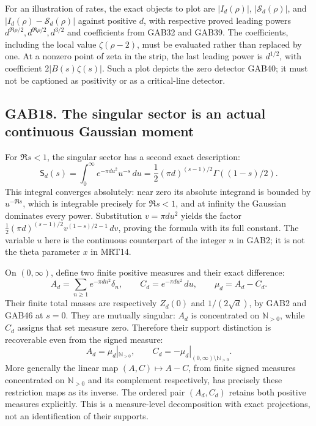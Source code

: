 \documentclass[
  10pt,
  a4paper,
]{article}
\begin{document}
For an illustration of rates, the exact objects to plot are
\(|I_d(\rho)|\), \(|\mathcal S_d(\rho)|\), and
\(|I_d(\rho)-\mathcal S_d(\rho)|\) against positive \(d\), with
respective proved leading powers \(d^{\Re\rho/2},d^{\Re\rho/2},d^{3/2}\)
and coefficients from GAB32 and GAB39. The coefficients, including the
local value \(\zeta(\rho-2)\), must be evaluated rather than replaced by
one. At a nonzero point of zeta in the strip, the last leading power is
\(d^{1/2}\), with coefficient \(2|B(s)\zeta(s)|\). Such a plot depicts
the zero detector GAB40; it must not be captioned as positivity or as a
critical-line detector.

\subsection{GAB18. The singular sector is an actual continuous Gaussian
moment}\label{gab18.-the-singular-sector-is-an-actual-continuous-gaussian-moment}

For \(\Re s<1\), the singular sector has a second exact description: \[
 \boxed{\displaystyle
 \mathsf S_d(s)=\int_0^\infty e^{-\pi d u^2}u^{-s}\,du
       =\frac12(\pi d)^{(s-1)/2}
                     \Gamma((1-s)/2).}                \tag{GAB46}
\] This integral converges absolutely: near zero its absolute integrand
is bounded by \(u^{-\Re s}\), which is integrable precisely for
\(\Re s<1\), and at infinity the Gaussian dominates every power.
Substitution \(v=\pi d u^2\) yields the factor
\(\frac12(\pi d)^{(s-1)/2}v^{(1-s)/2-1}\,dv\), proving the formula with
its full constant. The variable \(u\) here is the continuous counterpart
of the integer \(n\) in GAB2; it is not the theta parameter \(x\) in
MRT14.

On \((0,\infty)\), define two finite positive measures and their exact
difference: \[
 A_d=\sum_{n\ge1}e^{-\pi d n^2}\delta_n,\qquad
 C_d=e^{-\pi d u^2}\,du,\qquad
 \mu_d=A_d-C_d.                                       \tag{GAB47}
\] Their finite total masses are respectively \(Z_d(0)\) and
\(1/(2\sqrt d)\), by GAB2 and GAB46 at \(s=0\). They are mutually
singular: \(A_d\) is concentrated on \(\mathbb N_{>0}\), while \(C_d\)
assigns that set measure zero. Therefore their support distinction is
recoverable even from the signed measure: \[
 A_d=\mu_d|_{\mathbb N_{>0}},\qquad
 C_d=-\mu_d|_{(0,\infty)\setminus\mathbb N_{>0}}.
\] More generally the linear map \((A,C)\mapsto A-C\), from finite
signed measures concentrated on \(\mathbb N_{>0}\) and its complement
respectively, has precisely these restriction maps as its inverse. The
ordered pair \((A_d,C_d)\) retains both positive measures explicitly.
This is a measure-level decomposition with exact projections, not an
identification of their supports.
\end{document}
